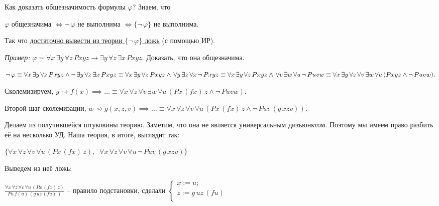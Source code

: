 \documentclass[a4paper, fleqn]{article}
\begin{document}
    Как доказать общезначимость формулы $\varphi$? Знаем, что 
    
    $\varphi$ общезначима $\iff \neg \, \varphi$ не выполнима $\iff \{ \neg \, \varphi\}$ не выполнима. 
    
    Так что \underline{достаточно вывести из теории $\{ \neg \, \varphi\}$ ложь} (с помощью ИР).
    
    \textit{Пример:} $\varphi \eqcirc \forall x \, \exists y \, \forall z \, Pxyz \to \exists y \, \forall z \, \exists x  \, Pxyz.$ Доказать, что она общезначима.
    
    $\neg \, \varphi \equiv \forall x \, \exists y \, \forall z \, Pxyz \land \neg \, \exists y \, \forall z \, \exists x  \, Pxyz \equiv \forall x \, \exists y \, \forall z \, Pxyz \land  \, \forall y \, \exists z \, \forall x  \, \neg \, Pxyz \equiv \forall x \, \exists y \, \forall z \, Pxyz \land  \, \forall v \, \exists w \, \forall u  \, \neg \, Puvw \equiv \\ \\ \forall x \, \exists y \, \forall z  \, \forall v \, \exists w \, \forall u \, (Pxyz \land  \neg \, Puvw).$ 
    
    Сколемизируем, $y \rightsquigarrow f(x) \implies \dots \equiv \forall x  \, \forall z  \, \forall v \, \exists w \, \forall u \, (Px \, (fx)\, z \land  \neg \, Puvw).$
    
    Второй шаг сколемизации, $w \rightsquigarrow g(x,z,v) \implies \dots \equiv \forall x \, \forall z  \, \forall v \, \forall u \, (Px \, (fx)\, z \land  \neg \, Puv \, (g \, xzv)). $
    
    Делаем из получившейся штуковины теорию. Заметим, что она не является универсальным дизъюнктом. Поэтому мы имеем право разбить её на несколько УД. Наша теория, в итоге, выглядит так:
    
    $\{\forall x \, \forall z  \, \forall v \, \forall u \, (Px \, (fx)\, z )  , \; \; \forall x \, \forall z  \, \forall v \, \forall u \, \neg \, Puv \, (g \, xzv)\}$
    
    Выведем из неё ложь:
    
    $\frac{\forall x \, \forall z  \, \forall v \, \forall u \, (Px \, (fx)\, z )}{P u \, f(u)\, (g \, uz \, (fu)\,)}$ -- правило подстановки, сделали $\begin{cases}
    x := u; \\
    z := g \, uz \, (fu) \\
    \end{cases}$
    
\end{document}
